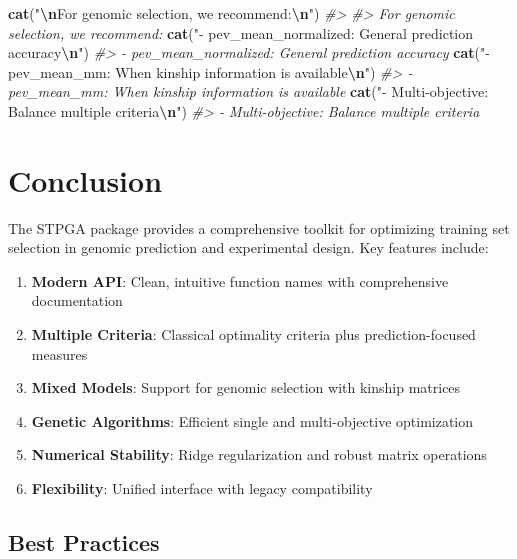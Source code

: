 \documentclass[
]{article}
\newenvironment{Shaded}{\begin{snugshade}}{\end{snugshade}}
\newcommand{\CommentTok}[1]{\textcolor[rgb]{0.56,0.35,0.01}{\textit{#1}}}
\newcommand{\FunctionTok}[1]{\textcolor[rgb]{0.13,0.29,0.53}{\textbf{#1}}}
\newcommand{\NormalTok}[1]{#1}
\newcommand{\SpecialCharTok}[1]{\textcolor[rgb]{0.81,0.36,0.00}{\textbf{#1}}}
\newcommand{\StringTok}[1]{\textcolor[rgb]{0.31,0.60,0.02}{#1}}
\providecommand{\tightlist}{%
  \setlength{\itemsep}{0pt}\setlength{\parskip}{0pt}}
\begin{document}
\begin{Shaded}
\begin{Highlighting}[]
\FunctionTok{cat}\NormalTok{(}\StringTok{"}\SpecialCharTok{\textbackslash{}n}\StringTok{For genomic selection, we recommend:}\SpecialCharTok{\textbackslash{}n}\StringTok{"}\NormalTok{)}
\CommentTok{\#\textgreater{} }
\CommentTok{\#\textgreater{} For genomic selection, we recommend:}
\FunctionTok{cat}\NormalTok{(}\StringTok{"{-} pev\_mean\_normalized: General prediction accuracy}\SpecialCharTok{\textbackslash{}n}\StringTok{"}\NormalTok{)}
\CommentTok{\#\textgreater{} {-} pev\_mean\_normalized: General prediction accuracy}
\FunctionTok{cat}\NormalTok{(}\StringTok{"{-} pev\_mean\_mm: When kinship information is available}\SpecialCharTok{\textbackslash{}n}\StringTok{"}\NormalTok{)}
\CommentTok{\#\textgreater{} {-} pev\_mean\_mm: When kinship information is available}
\FunctionTok{cat}\NormalTok{(}\StringTok{"{-} Multi{-}objective: Balance multiple criteria}\SpecialCharTok{\textbackslash{}n}\StringTok{"}\NormalTok{)}
\CommentTok{\#\textgreater{} {-} Multi{-}objective: Balance multiple criteria}
\end{Highlighting}
\end{Shaded}

\section{Conclusion}\label{conclusion}

The STPGA package provides a comprehensive toolkit for optimizing
training set selection in genomic prediction and experimental design.
Key features include:

\begin{enumerate}
\def\labelenumi{\arabic{enumi}.}
\tightlist
\item
  \textbf{Modern API}: Clean, intuitive function names with
  comprehensive documentation
\item
  \textbf{Multiple Criteria}: Classical optimality criteria plus
  prediction-focused measures
\item
  \textbf{Mixed Models}: Support for genomic selection with kinship
  matrices
\item
  \textbf{Genetic Algorithms}: Efficient single and multi-objective
  optimization
\item
  \textbf{Numerical Stability}: Ridge regularization and robust matrix
  operations
\item
  \textbf{Flexibility}: Unified interface with legacy compatibility
\end{enumerate}

\subsection{Best Practices}\label{best-practices}
\end{document}
